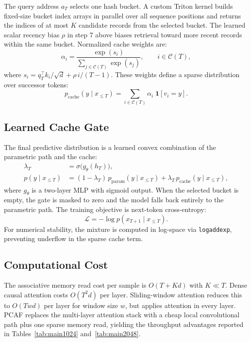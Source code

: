 \documentclass{article}
\begin{document}
The query address $a_T$ selects one hash bucket. A custom Triton kernel builds
fixed-size bucket index arrays in parallel over all sequence positions and
returns the indices of at most $K$ candidate records from the selected bucket.
The learned scalar recency bias $\rho$ in step 7 above biases retrieval toward
more recent records within the same bucket. Normalized cache weights are:
\begin{equation}
  \alpha_i =
  \frac{\exp(s_i)}{\sum_{j \in \mathcal{C}(T)} \exp(s_j)},
  \qquad i \in \mathcal{C}(T),
\end{equation}
where $s_i = q_T^\top k_i / \sqrt{d} + \rho\, i/(T-1)$.
These weights define a sparse distribution over successor tokens:
\begin{equation}
  p_{\mathrm{cache}}(y \mid x_{\leq T})
  = \sum_{i \in \mathcal{C}(T)} \alpha_i \;\mathbf{1}[v_i = y].
  \label{eq:cache-dist}
\end{equation}

\subsection{Learned Cache Gate}

The final predictive distribution is a learned convex combination of the
parametric path and the cache:
\begin{align}
  \lambda_T &= \sigma\bigl(g_{\theta}(h_T)\bigr), \\
  p(y \mid x_{\leq T}) &=
  (1 - \lambda_T)\,p_{\mathrm{param}}(y \mid x_{\leq T})
  + \lambda_T\,p_{\mathrm{cache}}(y \mid x_{\leq T}),
  \label{eq:mixture}
\end{align}
where $g_\theta$ is a two-layer MLP with sigmoid output. When the selected
bucket is empty, the gate is masked to zero and the model falls back entirely
to the parametric path. The training objective is next-token cross-entropy:
\begin{equation}
  \mathcal{L} = -\log p(x_{T+1} \mid x_{\leq T}).
\end{equation}
For numerical stability, the mixture is computed in log-space via
\texttt{logaddexp}, preventing underflow in the sparse cache term.

\subsection{Computational Cost}

The associative memory read cost per sample is $O(T + Kd)$ with $K \ll T$.
Dense causal attention costs $O(T^2 d)$ per layer. Sliding-window attention
reduces this to $O(Twd)$ per layer for window size $w$, but applies attention
in every layer. PCAF replaces the multi-layer attention stack with a cheap
local convolutional path plus one sparse memory read, yielding the throughput
advantages reported in Tables~\ref{tab:main1024} and~\ref{tab:main2048}.
\end{document}
